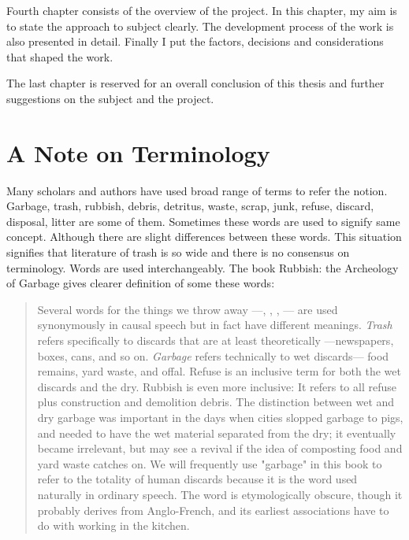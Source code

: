 Fourth chapter consists of the overview of the project. In this chapter, my aim is to state the approach to subject clearly. The development process of the work is also presented in detail. Finally I put the factors, decisions and considerations that shaped the work.

The last chapter is reserved for an overall conclusion of this thesis and further suggestions on the subject and the project.



\section{A Note on Terminology}
Many scholars and authors have used broad range of terms to refer the notion. Garbage, trash, rubbish, debris, detritus, waste, scrap, junk, refuse, discard, disposal, litter are some of them. Sometimes these words are used to signify same concept. Although there are slight differences between these words. This situation signifies that literature of trash is so wide and there is no consensus on terminology. Words are used interchangeably. The book Rubbish: the Archeology of Garbage gives clearer definition of some these words:

\begin{quote}
Several words for the things we throw away ---, , , --- are used synonymously in causal speech but in fact have different meanings. \textit{Trash} refers specifically to discards that are at least theoretically  ---newspapers, boxes, cans, and so on. \textit{Garbage} refers technically to wet discards--- food remains, yard waste, and offal. Refuse is an inclusive term for both the wet discards and the dry. Rubbish is even more inclusive: It refers to all refuse plus construction and demolition debris. The distinction between wet and dry garbage was important in the days when cities slopped garbage to pigs, and needed to have the wet material separated from the dry; it eventually became irrelevant, but may see a revival if the idea of composting food and yard waste catches on. We will frequently use "garbage" in this book to refer to the totality of human discards because it is the word used naturally in ordinary speech. The word is etymologically obscure, though it probably derives from Anglo-French, and its earliest associations have to do with working in the kitchen. \citep[9]{rathje1992rubbish}
\end{quote}

